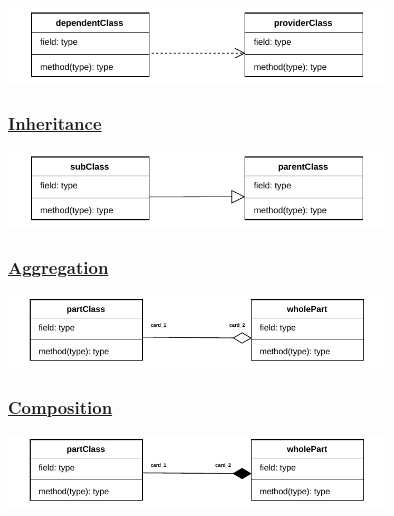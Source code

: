 \begin{center}
\includegraphics[width=0.75\textwidth]{Chapters/Diagram/OOP/Sum/Depend/depend.drawio.pdf}
\end{center}

\subsubsection*{\underline{Inheritance}}

\begin{center}
\includegraphics[width=0.75\textwidth]{Chapters/Diagram/OOP/Sum/Inhe/inherit.drawio.pdf}
\end{center}

\subsubsection*{\underline{Aggregation}}

\begin{center}
\includegraphics[width=0.75\textwidth]{Chapters/Diagram/OOP/Sum/Aggrega/aggrega.drawio.pdf}
\end{center}

\subsubsection*{\underline{Composition}}

\begin{center}
\includegraphics[width=0.75\textwidth]{Chapters/Diagram/OOP/Sum/Composition/composition.drawio.pdf}
\end{center}
